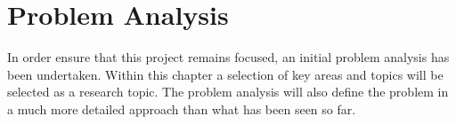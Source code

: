 \chapter{Problem Analysis}

In order ensure that this project remains focused, an initial problem analysis
has been undertaken. Within this chapter a selection of key areas and topics 
will be selected as a research topic. The problem analysis will also define the
problem in a much more detailed approach than what has been seen so far.

\newpage


\newpage


\newpage

